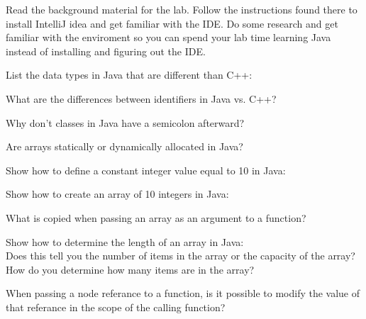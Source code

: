 \documentclass[../../main.tex]{subfiles}
\begin{document}
\begin{steps}
   \item Read the background material for the lab. Follow the instructions found there to install IntelliJ
      idea and get familiar with the IDE. Do some research and get familiar with the enviroment so you can
      spend your lab time learning Java instead of installing and figuring out the IDE.
   \item List the data types in Java that are different than C++:\\
      \vspace{2cm}
   \item What are the differences between identifiers in Java vs. C++?\\
      \vspace{2cm}
   \item Why don't classes in Java have a semicolon afterward?\\
      \vspace{2cm}
   \item Are arrays statically or dynamically allocated in Java?\\
      \vspace{2cm}
   \item Show how to define a constant integer value equal to 10 in Java:\\
      \vspace{2cm}
   \item Show how to create an array of 10 integers in Java:\\
      \vspace{2cm}
   \item What is copied when passing an array as an argument to a function?\\
      \vspace{2cm}
   \item Show how to determine the length of an array in Java:\\
      \vspace{2cm}
      Does this tell you the number of items in the array or the capacity of the array?\\
      \vspace{2cm}
      How do you determine how many items are in the array?\\
      \vspace{2cm}
   \item When passing a node referance to a function, is it possible to modify the value of that referance in the scope of the calling function?\\
      \vspace{2cm}
\end{steps}
\end{document}
